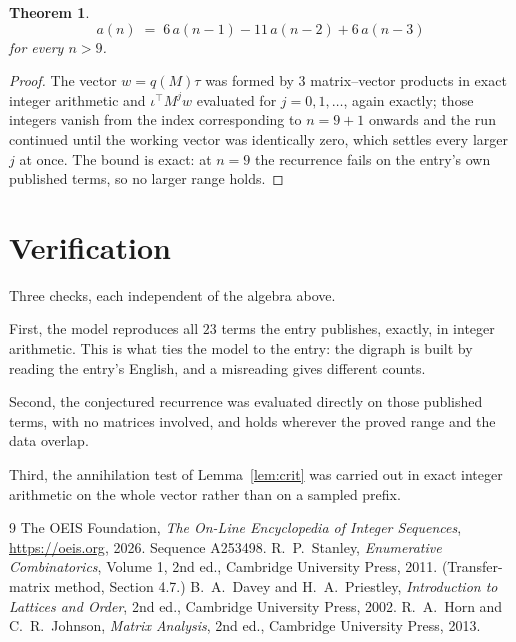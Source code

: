 \documentclass[11pt,a4paper]{article}
\theoremstyle{plain}
\newtheorem{theorem}{Theorem}
\theoremstyle{definition}
\begin{document}
\begin{theorem}
\[
a(n)\;=\;6\,a(n-1) - 11\,a(n-2) + 6\,a(n-3)
\]
for every $n>9$.
\end{theorem}

\begin{proof}
The vector $w=q(M)\tau$ was formed by $3$ matrix--vector products in exact integer
arithmetic and $\iota^{\!\top}M^{j}w$ evaluated for $j=0,1,\dots$, again exactly; those
integers vanish from the index corresponding to $n=9+1$ onwards and the run continued
until the working vector was identically zero, which settles every larger $j$ at once. The bound is exact: at $n=9$ the recurrence fails on the entry's own published terms, so no larger range holds.
\end{proof}

\section{Verification}

Three checks, each independent of the algebra above.

First, the model reproduces all $23$ terms the entry publishes, exactly, in integer
arithmetic. This is what ties the model to the entry: the digraph is built by reading the
entry's English, and a misreading gives different counts.

Second, the conjectured recurrence was evaluated directly on those published terms, with no
matrices involved, and holds wherever the proved range and the data overlap.

Third, the annihilation test of Lemma~\ref{lem:crit} was carried out in exact integer
arithmetic on the whole vector rather than on a sampled prefix.

\begin{thebibliography}{9}
 The OEIS Foundation, \emph{The On-Line Encyclopedia of Integer
Sequences}, \url{https://oeis.org}, 2026. Sequence A253498.
 R.~P.~Stanley, \emph{Enumerative Combinatorics}, Volume 1, 2nd ed.,
Cambridge University Press, 2011. (Transfer-matrix method, Section 4.7.)
 B.~A.~Davey and H.~A.~Priestley, \emph{Introduction to Lattices and
Order}, 2nd ed., Cambridge University Press, 2002.
 R.~A.~Horn and C.~R.~Johnson, \emph{Matrix Analysis}, 2nd ed., Cambridge
University Press, 2013.
\end{thebibliography}
\end{document}
